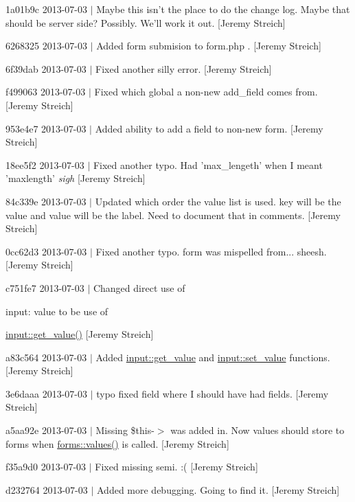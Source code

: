 \begin{DoxyItemize}
\item 1a01b9c 2013-\/07-\/03 $|$ Maybe this isn't the place to do the change log. Maybe that should be server side? Possibly. We'll work it out. \mbox{[}Jeremy Streich\mbox{]}
\item 6268325 2013-\/07-\/03 $|$ Added form submision to form.\-php . \mbox{[}Jeremy Streich\mbox{]}
\item 6f39dab 2013-\/07-\/03 $|$ Fixed another silly error. \mbox{[}Jeremy Streich\mbox{]}
\item f499063 2013-\/07-\/03 $|$ Fixed which global a non-\/new add\-\_\-field comes from. \mbox{[}Jeremy Streich\mbox{]}
\item 953e4e7 2013-\/07-\/03 $|$ Added ability to add a field to non-\/new form. \mbox{[}Jeremy Streich\mbox{]}
\item 18ee5f2 2013-\/07-\/03 $|$ Fixed another typo. Had 'max\-\_\-lengeth' when I meant 'maxlength' {\itshape sigh} \mbox{[}Jeremy Streich\mbox{]}
\item 84c339e 2013-\/07-\/03 $|$ Updated which order the value list is used. key will be the value and value will be the label. Need to document that in comments. \mbox{[}Jeremy Streich\mbox{]}
\item 0cc62d3 2013-\/07-\/03 $|$ Fixed another typo. form was mispelled from... sheesh. \mbox{[}Jeremy Streich\mbox{]}
\item c751fe7 2013-\/07-\/03 $|$ Changed direct use of \begin{DoxyParagraph}{input\-:}
value to be use of 
\end{DoxyParagraph}
\hyperlink{classinput_a1b3bcdbb596a1154a944a169ac67f547}{input\-::get\-\_\-value()} \mbox{[}Jeremy Streich\mbox{]}
\item a83c564 2013-\/07-\/03 $|$ Added \hyperlink{classinput_a1b3bcdbb596a1154a944a169ac67f547}{input\-::get\-\_\-value} and \hyperlink{classinput_a2383e00d55bf3dbcc7071b2fe1336aec}{input\-::set\-\_\-value} functions. \mbox{[}Jeremy Streich\mbox{]}
\item 3e6daaa 2013-\/07-\/03 $|$ typo fixed field where I should have had fields. \mbox{[}Jeremy Streich\mbox{]}
\item a5aa92e 2013-\/07-\/03 $|$ Missing \$this-\/$>$ was added in. Now values should store to forms when \hyperlink{classforms_ad66e3f3a4d5332bbd15e53680930d786}{forms\-::values()} is called. \mbox{[}Jeremy Streich\mbox{]}
\item f35a9d0 2013-\/07-\/03 $|$ Fixed missing semi. \-:( \mbox{[}Jeremy Streich\mbox{]}
\item d232764 2013-\/07-\/03 $|$ Added more debugging. Going to find it. \mbox{[}Jeremy Streich\mbox{]}

\end{DoxyItemize}
